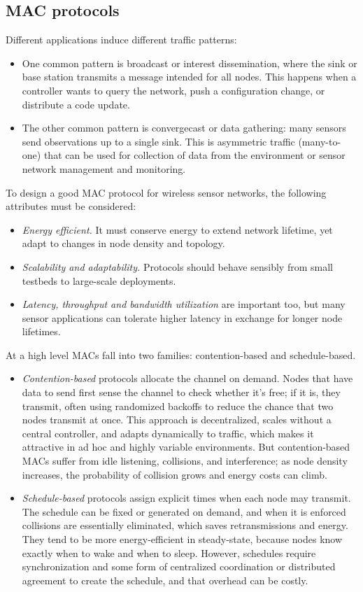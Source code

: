 \subsection{MAC protocols}
Different applications induce different traffic patterns:
\begin{itemize}
    \item One common pattern is broadcast or interest dissemination, where the sink or base station transmits a message intended for all nodes. This happens when a controller wants to query the network, push a configuration change, or distribute a code update.
    \item The other common pattern is convergecast or data gathering: many sensors send observations up to a single sink. This is asymmetric traffic (many-to-one) that can be used for collection of data from the environment or sensor network management and monitoring.
\end{itemize}
To design a good MAC protocol for wireless sensor networks, the following attributes must be considered:
\begin{itemize}
    \item \textit{Energy efficient.} It must conserve energy to extend network lifetime, yet adapt to changes in node density and topology. 
    \item \textit{Scalability and adaptability.} Protocols should behave sensibly from small testbeds to large-scale deployments.
    \item \textit{Latency, throughput and bandwidth utilization} are important too, but many sensor applications can tolerate higher latency in exchange for longer node lifetimes.
\end{itemize}
At a high level MACs fall into two families: contention-based and schedule-based.
\begin{itemize}
    \item \textit{Contention-based} protocols allocate the channel on demand. Nodes that have data to send first sense the channel to check whether it’s free; if it is, they transmit, often using randomized backoffs to reduce the chance that two nodes transmit at once. This approach is decentralized, scales without a central controller, and adapts dynamically to traffic, which makes it attractive in ad hoc and highly variable environments. But contention-based MACs suffer from idle listening, collisions, and interference; as node density increases, the probability of collision grows and energy costs can climb.
    \item \textit{Schedule-based} protocols assign explicit times when each node may transmit. The schedule can be fixed or generated on demand, and when it is enforced collisions are essentially eliminated, which saves retransmissions and energy. They tend to be more energy-efficient in steady-state, because nodes know exactly when to wake and when to sleep. However, schedules require synchronization and some form of centralized coordination or distributed agreement to create the schedule, and that overhead can be costly.
\end{itemize}
